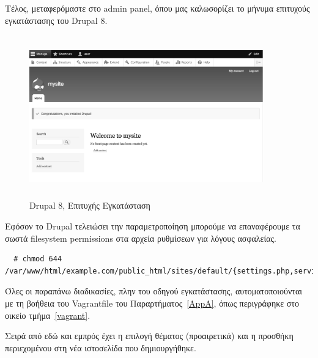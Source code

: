 \documentclass[12pt]{report}
\begin{document}
Τέλος, μεταφερόμαστε στο \textlatin{admin panel}, όπου μας καλωσορίζει το μήνυμα επιτυχούς εγκατάστασης του \textlatin{Drupal 8}.
\begin{figure}[H]
\centering
\includegraphics[width=0.9\textwidth, height=7cm]{drupal-gray}
\caption{\textlatin{Drupal 8}, Επιτυχής Εγκατάσταση}
\label{fig:drupal_success}
\end{figure}

Εφόσον το \textlatin{Drupal} τελειώσει την παραμετροποίηση μπορούμε να επαναφέρουμε τα σωστά \textlatin{filesystem permissions} στα αρχεία ρυθμίσεων για λόγους ασφαλείας.
\scriptsize
\begin{verbatim}
  # chmod 644 /var/www/html/example.com/public_html/sites/default/{settings.php,services.yml}
\end{verbatim}
\normalsize
{}

Όλες οι παραπάνω διαδικασίες, πλην του οδηγού εγκατάστασης, αυτοματοποιούνται με τη βοήθεια του \textlatin{Vagrantfile} του Παραρτήματος~\ref{AppA}, όπως περιγράφηκε στο οικείο τμήμα~\ref{vagrant}.

Σειρά από εδώ και εμπρός έχει η επιλογή θέματος (προαιρετικά) και η προσθήκη περιεχομένου στη νέα ιστοσελίδα που δημιουργήθηκε.
\end{document}
